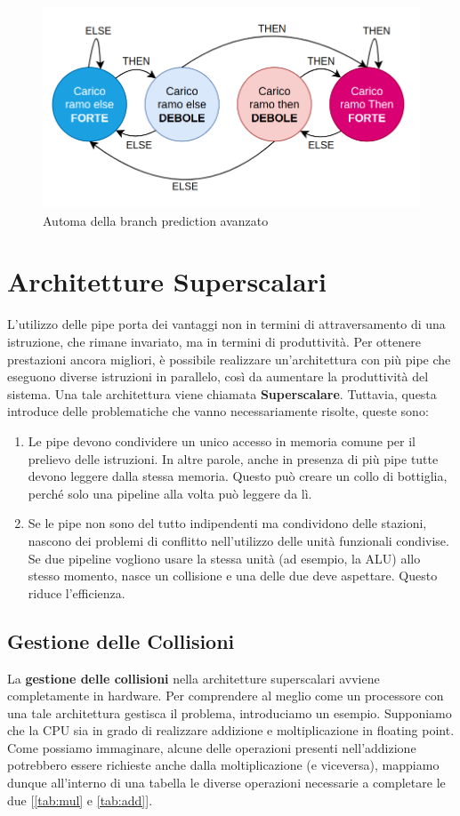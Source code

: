 \begin{figure}[!ht]
    \centering
    \includegraphics[width=.5\textwidth]{img/automa-complesso.png}
    \caption{Automa della branch prediction avanzato}\label{img:automa-complesso}
\end{figure}

\section{Architetture Superscalari}
L'utilizzo delle pipe porta dei vantaggi non in termini di attraversamento di una istruzione, che rimane invariato, ma in termini di produttività. Per ottenere prestazioni ancora migliori, è possibile realizzare un'architettura con più pipe che eseguono diverse istruzioni in parallelo, così da aumentare la produttività del sistema. Una tale architettura viene chiamata \textbf{Superscalare}. Tuttavia, questa introduce delle problematiche che vanno necessariamente risolte, queste sono:
\begin{enumerate}
    \item Le pipe devono condividere un unico accesso in memoria comune per il prelievo delle istruzioni. In altre parole, anche in presenza di più pipe tutte devono leggere dalla stessa memoria. Questo può creare un collo di bottiglia, perché solo una pipeline alla volta può leggere da lì.
    \item Se le pipe non sono del tutto indipendenti ma condividono delle stazioni, nascono dei problemi di conflitto nell'utilizzo delle unità funzionali condivise. Se due pipeline vogliono usare la stessa unità (ad esempio, la ALU) allo stesso momento, nasce un collisione e una delle due deve aspettare. Questo riduce l'efficienza.
\end{enumerate}

\subsection{Gestione delle Collisioni}
La \textbf{gestione delle collisioni} nella architetture superscalari avviene completamente in hardware. Per comprendere al meglio come un processore con una tale architettura gestisca il problema, introduciamo un esempio. Supponiamo che la CPU sia in grado di realizzare addizione e moltiplicazione in floating point. Come possiamo immaginare, alcune delle operazioni presenti nell'addizione potrebbero essere richieste anche dalla moltiplicazione (e viceversa), mappiamo dunque all'interno di una tabella le diverse operazioni necessarie a completare le due [\ref{tab:mul} e \ref{tab:add}].

